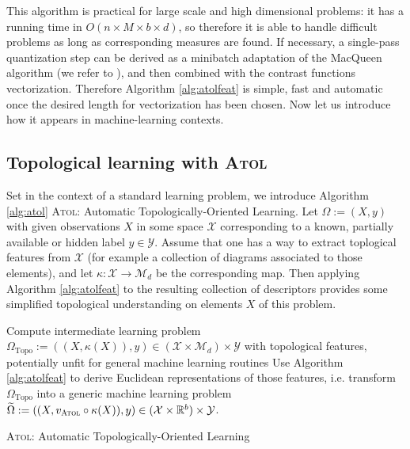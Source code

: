 \documentclass[twoside]{article}
\begin{document}
This algorithm is practical for large scale and high dimensional problems: it has a running time in $O(n \times M \times b \times d)$, so therefore it is able to handle difficult problems as long as corresponding measures are found. If necessary, a single-pass quantization step can be derived as a minibatch adaptation of the \cite{MacQueen67} MacQueen algorithm (we refer to \cite{levrard20}), and then combined with the contrast functions vectorization. Therefore Algorithm \ref{alg:atolfeat} is simple, fast and automatic once the desired length for vectorization has been chosen. Now let us introduce how it appears in machine-learning contexts.



\subsection{Topological learning with \textsc{Atol}}\label{sec:topological-learning}

Set in the context of a standard learning problem, we introduce Algorithm \ref{alg:atol} \textsc{Atol}: Automatic Topologically-Oriented Learning. Let $\Omega := (X, y)$ with given observations $X$ in some space $\mathcal{X}$ corresponding to a known, partially available or hidden label $y \in \mathcal{Y}$. Assume that one has a way to extract toplogical features from $\mathcal{X}$ (for example a collection of diagrams associated to those elements), and let $\kappa: \mathcal{X} \rightarrow \mathcal{M}_d$ be the corresponding map. Then applying Algorithm \ref{alg:atolfeat} to the resulting collection of descriptors provides some simplified topological understanding on elements $X$ of this problem.

\begin{algorithm2e} %
	\SetAlgoLined
		
	Compute intermediate learning problem ${\Omega}_{\text{Topo}} := ((X, \kappa(X)), y) \in (\mathcal{X} \times \mathcal{M}_d) \times \mathcal{Y}$ with topological features, potentially unfit for general machine learning routines\;
	Use Algorithm \ref{alg:atolfeat} to derive Euclidean representations of those features, i.e. transform ${\Omega}_{\text{Topo}}$ into a generic machine learning problem $\widetilde{\Omega} := ((X, v_\textsc{Atol} \circ \kappa(X)), y) \in (\mathcal{X}\times\mathbb{R}^b) \times \mathcal{Y}$. \;
	\caption{\textsc{Atol}: Automatic Topologically-Oriented Learning}\label{alg:atol}
\end{algorithm2e}
\end{document}
